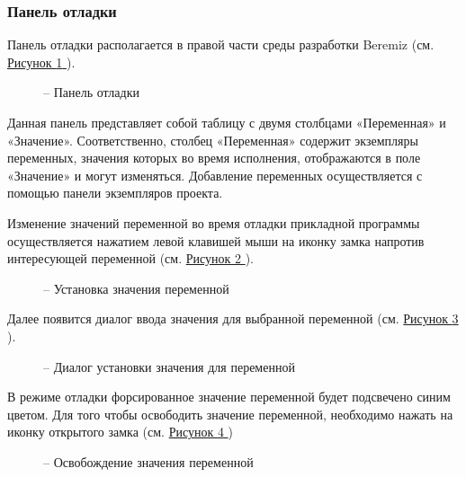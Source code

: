 \documentclass[letterpaper,10pt,russian]{sphinxmanual}
\begin{document}
\subsubsection{Панель отладки}
\label{usage_guide/ide_components:id12}
Панель отладки располагается в правой части среды разработки Beremiz
(см. \hyperref[usage_guide/ide_components:image136]{Рисунок \ref{usage_guide/ide_components:image136} }).
\begin{figure}[htbp]
\centering
\capstart

\noindent{}
\caption{– Панель отладки}\label{usage_guide/ide_components:image136}\end{figure}

Данная панель представляет собой таблицу с двумя столбцами «Переменная»
и «Значение». Соответственно, столбец «Переменная» содержит экземпляры
переменных, значения которых во время исполнения, отображаются в поле
«Значение» и могут изменяться. Добавление переменных осуществляется с
помощью панели экземпляров проекта.

Изменение значений переменной во время отладки прикладной программы
осуществляется нажатием левой клавишей мыши на иконку замка напротив
интересующей переменной (см. \hyperref[usage_guide/ide_components:image137]{Рисунок \ref{usage_guide/ide_components:image137} }).
\begin{figure}[htbp]
\centering
\capstart

\noindent{}
\caption{– Установка значения переменной}\label{usage_guide/ide_components:image137}\end{figure}

Далее появится диалог ввода значения для выбранной переменной (см. \hyperref[usage_guide/ide_components:image138]{Рисунок \ref{usage_guide/ide_components:image138} }).
\begin{figure}[htbp]
\centering
\capstart

\noindent{}
\caption{– Диалог установки значения для переменной}\label{usage_guide/ide_components:image138}\end{figure}

В режиме отладки форсированное значение переменной будет подсвечено
синим цветом. Для того чтобы освободить значение переменной, необходимо
нажать на иконку открытого замка (см. \hyperref[usage_guide/ide_components:image139]{Рисунок \ref{usage_guide/ide_components:image139} })
\begin{figure}[htbp]
\centering
\capstart

\noindent{}
\caption{– Освобождение значения переменной}\label{usage_guide/ide_components:image139}\end{figure}
\end{document}
